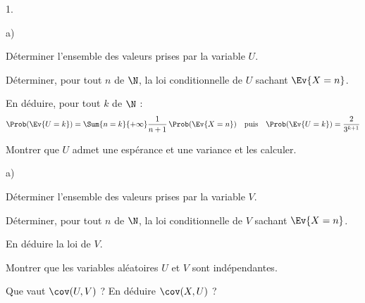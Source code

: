 \documentclass[11pt]{article}%
\begin{document}
\begin{noliste}{1.}
  \setlength{\itemsep}{4mm}
  \setcounter{enumi}{1}
  \item 
  \begin{noliste}{a)}
    \setlength{\itemsep}{2mm}
    \item Déterminer l'ensemble des valeurs prises par la variable $U$.
    
    
    
    

    
    \item Déterminer, pour tout $n$ de $\N$, la loi conditionnelle de 
    $U$ sachant $\Ev{X=n}$.
    
    

    
    \item En déduire, pour tout $k$ de $\N$ :
    \[
      \Prob(\Ev{U=k}) = \Sum{n=k}{+\infty} \dfrac{1}{n+1} \, 
      \Prob(\Ev{X=n}) \quad \text{puis} \quad \Prob(\Ev{U=k}) = 
      \dfrac{2}{3^{k+1}}
    \]
    
    
    
    \item Montrer que $U$ admet une espérance et une variance et les 
    calculer.
    
    
  \end{noliste}
  
  
  
  
  \item 
  \begin{noliste}{a)}
    \setlength{\itemsep}{2mm}
    \item Déterminer l'ensemble des valeurs prises par la variable $V$.
    
    
    
    \item Déterminer, pour tout $n$ de $\N$, la loi conditionnelle de 
    $V$ sachant $\Ev{X=n}$.
    
    
    
    

    
    \item En déduire la loi de $V$.
    
    
  \end{noliste}
  
  \item Montrer que les variables aléatoires $U$ et $V$ sont 
  indépendantes.
  
  

  
  \item Que vaut $\cov(U,V)$ ? En déduire $\cov(X,U)$ ?
  
  
\end{noliste}
\end{document}
